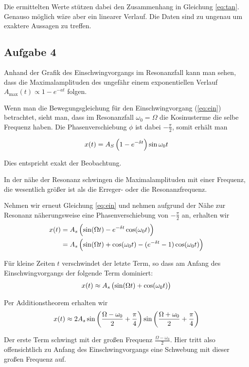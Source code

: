 \documentclass[a4paper,german,12pt,smallheadings]{scrartcl}
\begin{document}
Die ermittelten Werte stützen dabei den Zusammenhang in Gleichung \ref{eq:tan}.
Genauso möglich wäre aber ein linearer Verlauf. Die Daten sind zu ungenau um
exaktere Aussagen zu treffen.

\subsection{Aufgabe 4}
Anhand der Grafik des Einschwingvorgangs im Resonanzfall kann man sehen, dass
die Maximalamplituden des ungefähr einem exponentiellen Verlauf
$A_\text{max}(t) \propto 1 - e^{- a t}$ folgen.

Wenn man die Bewegungsgleichung für den Einschwingvorgang
(\ref{eq:ein}) betrachtet, sieht man, dass im Resonanzfall $\omega_0 = \Omega$
die Kosinusterme die selbe Frequenz haben. Die Phasenverschiebung $\phi$ ist
dabei $-\frac{\pi}{2}$, somit erhält man

\begin{equation}
  x(t) = A_S \del{1 - e^{-\delta t}} \sin \omega_0 t
\end{equation}

Dies entspricht exakt der Beobachtung.

In der nähe der Resonanz schwingen die Maximalamplituden mit einer Frequenz,
die wesentlich größer ist als die Erreger- oder die Resonanzfrequenz.

Nehmen wir erneut Gleichung \ref{eq:ein} und nehmen aufgrund der Nähe zur
Resonanz näherungsweise eine Phasenverschiebung von $-\frac{\pi}{2}$ an,
erhalten wir
\begin{align}
  x(t) &= A_s \del{\sin(\Omega t) - e^{-\delta t} \cos(\omega_0 t)} \\
       &= A_s \del{\sin(\Omega t) + \cos(\omega_0 t) - (e^{-\delta t} - 1) \cos(\omega_0 t)}
\end{align}

Für kleine Zeiten $t$ verschwindet der letzte Term, so dass am Anfang des
Einschwingvorgangs der folgende Term dominiert:
\begin{equation}
  x(t) \approx A_s \del{\sin(\Omega t) + \cos(\omega_0 t)}
\end{equation}

Per Additionstheorem erhalten wir
\begin{equation}
  x(t) \approx 2 A_s \sin\del{\frac{\Omega - \omega_0}{2} + \frac{\pi}{4}}
  \sin\del{\frac{\Omega + \omega_0}{2} + \frac{\pi}{4}}
\end{equation}

Der erste Term schwingt mit der großen Frequenz $\frac{\Omega - \omega_0}{2}$.
Hier tritt also offensichtlich zu Anfang des Einschwingvorgangs eine Schwebung
mit dieser großen Frequenz auf.
\end{document}
